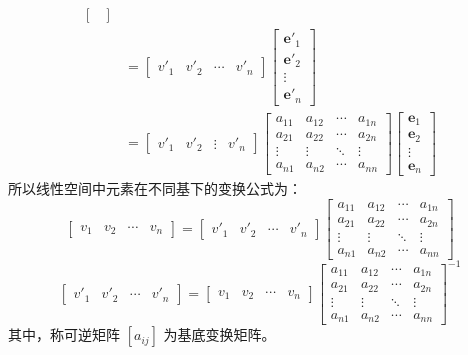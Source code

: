 \begin{definition}[坐标变换矩阵]
\begin{align*}
\begin{bmatrix}
        \end{bmatrix} \\
        &= \begin{bmatrix}
            v'_1 & v'_2 & \cdots & v'_n
        \end{bmatrix}\begin{bmatrix}
            \mathbf{e}'_1 \\ \mathbf{e}'_2 \\ \vdots \\ \mathbf{e}'_n
        \end{bmatrix}\\
        &= \begin{bmatrix}
            v'_1 & v'_2 & \vdots & v'_n
        \end{bmatrix}\begin{bmatrix}
            a_{11} & a_{12} & \cdots & a_{1n} \\
            a_{21} & a_{22} & \cdots & a_{2n} \\
            \vdots & \vdots & \ddots & \vdots \\
            a_{n1} & a_{n2} & \cdots & a_{nn}
        \end{bmatrix}
        \begin{bmatrix}
            \mathbf{e}_1 \\ \mathbf{e}_2 \\ \vdots \\ \mathbf{e}_n
        \end{bmatrix}
    \end{align*}
    所以线性空间中元素在不同基下的变换公式为：
    \[
        \begin{bmatrix}
            v_1 & v_2 & \cdots & v_n
        \end{bmatrix} =
        \begin{bmatrix}
            v'_1 & v'_2 & \cdots & v'_n
        \end{bmatrix}
        \begin{bmatrix}
            a_{11} & a_{12} & \cdots & a_{1n} \\
            a_{21} & a_{22} & \cdots & a_{2n} \\
            \vdots & \vdots & \ddots & \vdots \\
            a_{n1} & a_{n2} & \cdots & a_{nn}
        \end{bmatrix}
    \]
    \[
        \begin{bmatrix}
            v'_1 & v'_2 & \cdots & v'_n
        \end{bmatrix} =
        \begin{bmatrix}
            v_1 & v_2 & \cdots & v_n
        \end{bmatrix}
        \begin{bmatrix}
            a_{11} & a_{12} & \cdots & a_{1n} \\
            a_{21} & a_{22} & \cdots & a_{2n} \\
            \vdots & \vdots & \ddots & \vdots \\
            a_{n1} & a_{n2} & \cdots & a_{nn}
        \end{bmatrix}^{-1}
    \]
    其中，称可逆矩阵 $[a_{ij}]$ 为基底变换矩阵。
\end{definition}
